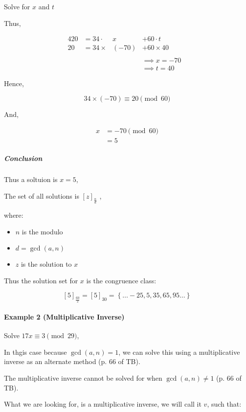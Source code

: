 \documentclass[
]{article}
\begin{document}
Solve for \(x\) and \(t\)

Thus,

\begin{alignat}{4}
20 &= 34 \cdot &x      &+ 60 \cdot t& \\
20 &= 34 \times &(-70) &+ 60 \times 40& \\
\ \\
&&&\implies x = -70\\
&&&\implies t = 40
\end{alignat}

Hence,

\[34 \times (-70) \equiv 20 \pmod{60}\]

And,

\begin{align}
x &= -70 \pmod{60} \\
  &= 5
\end{align}

\hypertarget{header-n599}{%
\subparagraph{Conclusion}\label{header-n599}}

Thus a soltuion is \(x = 5\),

The set of all solutions is \([z]_{\frac{n}{d}}\) ,

where:

\begin{itemize}
\item
  \(n\) is the modulo
\item
  \(d = \gcd(a,n)\)
\item
  \(z\) is the solution to \(x\)
\end{itemize}

Thus the solution set for \(x\) is the congruence class:

\[[5]_{\frac{60}{2}} = [5]_{30} = \left \{  \dots -25, 5, 35, 65, 95 \dots \right \}\]

\hypertarget{header-n613}{%
\paragraph{Example 2 (Multiplicative Inverse)}\label{header-n613}}

Solve \(17x \equiv 3 \pmod{29}\),

In thgis case because \(\gcd(a,n) = 1\), we can solve this using a
multiplicative inverse as an alternate method (p. 66 of TB).

The multiplicative inverse cannot be solved for when
\(\gcd(a,n) \neq 1\) (p. 66 of TB).

What we are looking for, is a multiplicative inverse, we will call it
\(v\), such that:
\end{document}
